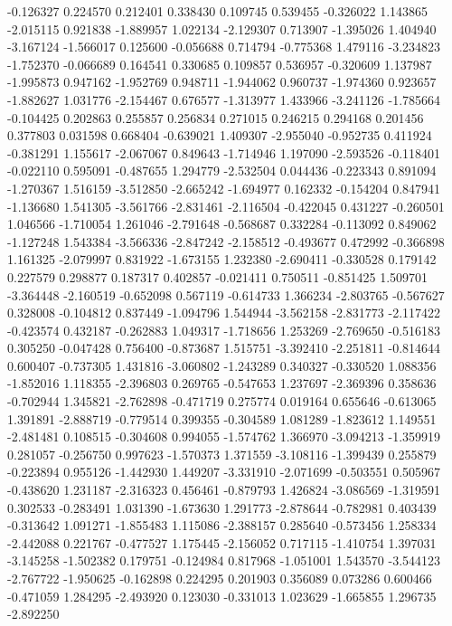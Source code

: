 -0.126327
0.224570
0.212401
0.338430
0.109745
0.539455
-0.326022
1.143865
-2.015115
0.921838
-1.889957
1.022134
-2.129307
0.713907
-1.395026
1.404940
-3.167124
-1.566017
0.125600
-0.056688
0.714794
-0.775368
1.479116
-3.234823
-1.752370
-0.066689
0.164541
0.330685
0.109857
0.536957
-0.320609
1.137987
-1.995873
0.947162
-1.952769
0.948711
-1.944062
0.960737
-1.974360
0.923657
-1.882627
1.031776
-2.154467
0.676577
-1.313977
1.433966
-3.241126
-1.785664
-0.104425
0.202863
0.255857
0.256834
0.271015
0.246215
0.294168
0.201456
0.377803
0.031598
0.668404
-0.639021
1.409307
-2.955040
-0.952735
0.411924
-0.381291
1.155617
-2.067067
0.849643
-1.714946
1.197090
-2.593526
-0.118401
-0.022110
0.595091
-0.487655
1.294779
-2.532504
0.044436
-0.223343
0.891094
-1.270367
1.516159
-3.512850
-2.665242
-1.694977
0.162332
-0.154204
0.847941
-1.136680
1.541305
-3.561766
-2.831461
-2.116504
-0.422045
0.431227
-0.260501
1.046566
-1.710054
1.261046
-2.791648
-0.568687
0.332284
-0.113092
0.849062
-1.127248
1.543384
-3.566336
-2.847242
-2.158512
-0.493677
0.472992
-0.366898
1.161325
-2.079997
0.831922
-1.673155
1.232380
-2.690411
-0.330528
0.179142
0.227579
0.298877
0.187317
0.402857
-0.021411
0.750511
-0.851425
1.509701
-3.364448
-2.160519
-0.652098
0.567119
-0.614733
1.366234
-2.803765
-0.567627
0.328008
-0.104812
0.837449
-1.094796
1.544944
-3.562158
-2.831773
-2.117422
-0.423574
0.432187
-0.262883
1.049317
-1.718656
1.253269
-2.769650
-0.516183
0.305250
-0.047428
0.756400
-0.873687
1.515751
-3.392410
-2.251811
-0.814644
0.600407
-0.737305
1.431816
-3.060802
-1.243289
0.340327
-0.330520
1.088356
-1.852016
1.118355
-2.396803
0.269765
-0.547653
1.237697
-2.369396
0.358636
-0.702944
1.345821
-2.762898
-0.471719
0.275774
0.019164
0.655646
-0.613065
1.391891
-2.888719
-0.779514
0.399355
-0.304589
1.081289
-1.823612
1.149551
-2.481481
0.108515
-0.304608
0.994055
-1.574762
1.366970
-3.094213
-1.359919
0.281057
-0.256750
0.997623
-1.570373
1.371559
-3.108116
-1.399439
0.255879
-0.223894
0.955126
-1.442930
1.449207
-3.331910
-2.071699
-0.503551
0.505967
-0.438620
1.231187
-2.316323
0.456461
-0.879793
1.426824
-3.086569
-1.319591
0.302533
-0.283491
1.031390
-1.673630
1.291773
-2.878644
-0.782981
0.403439
-0.313642
1.091271
-1.855483
1.115086
-2.388157
0.285640
-0.573456
1.258334
-2.442088
0.221767
-0.477527
1.175445
-2.156052
0.717115
-1.410754
1.397031
-3.145258
-1.502382
0.179751
-0.124984
0.817968
-1.051001
1.543570
-3.544123
-2.767722
-1.950625
-0.162898
0.224295
0.201903
0.356089
0.073286
0.600466
-0.471059
1.284295
-2.493920
0.123030
-0.331013
1.023629
-1.665855
1.296735
-2.892250
